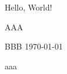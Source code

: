 \documentclass[a4paper]{article}
\begin{document}
Hello, World!

AAA

BBB
\today

aaa
\end{document}
